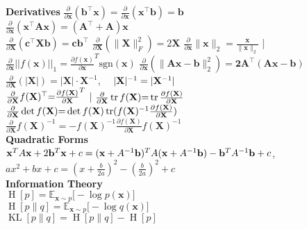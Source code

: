 \textbf{Derivatives} \quad
$\frac{\partial}{\partial \mathbf{x}}(\mathbf{b}^\top \mathbf{x}) = \frac{\partial}{\partial \mathbf{x}}(\mathbf{x}^\top \mathbf{b}) = \mathbf{b}$ \\
$\frac{\partial}{\partial \mathbf{x}}(\mathbf{x}^\top \mathbf{A}\mathbf{x}) = (\mathbf{A}^\top + \mathbf{A})\mathbf{x}$ \\
$\frac{\partial}{\partial \mathbf{X}}(\mathbf{c}^\top \mathbf{X} \mathbf{b}) {=} \mathbf{c}\mathbf{b}^\top$
$\frac{\partial}{\partial \mathbf{X}}(\|\mathbf{X}\|_F^2) {=} 2\mathbf{X}$
$\frac{\partial}{\partial \mathbf{x}}\| \mathbf{x} \|_2 {=} \frac{\mathbf{x}}{\|\mathbf{x}\|_2}$ |
$\frac{\partial}{\partial \mathbf{x}}||f(\mathbf{x})||_1 {=} \frac{\partial f(\mathbf{x})}{\partial \mathbf{x}}^T\text{sgn}(\mathbf{x})$
$\frac{\partial}{\partial \mathbf{x}}(\|\mathbf{Ax - b}\|_2^2) = \mathbf{2A^\top( Ax- b)}$ \\
$\frac{\partial}{\partial \mathbf{X}}(|\mathbf{X}|) = |\mathbf{X}|\cdot \mathbf{X}^{-1}$, $\quad |\mathbf{X}|^{-1} = |\mathbf{X}^{-1}|$\\
$\frac{\partial}{\partial \mathbf{X}} f(\mathbf{X})^\top {=} \frac{\partial f(\mathbf{X})}{\partial \mathbf{X}}^T$ | 
$\frac{\partial}{\partial \mathbf{X}} \operatorname{tr}f(\mathbf{X}) {=} \operatorname{tr}  \frac{\partial f(\mathbf{X})}{\partial \mathbf{X}}$ \\
$\frac{\partial}{\partial \mathbf{X}} \det f(\mathbf{X}) {=} \det f(\mathbf{X}) \operatorname{tr} (f(\mathbf{X})^{-1} \frac{\partial f(\mathbf{X})}{\partial \mathbf{X}})$ \\
$\frac{\partial}{\partial \mathbf{X}} f(\mathbf{X})^{-1} = - f(\mathbf{X})^{-1} \frac{\partial f(\mathbf{X})}{\partial \mathbf{X}} f(\mathbf{X})^{-1}$ 
\vspace{4 px} \\
\textbf{Quadratic Forms} \\
$\mathbf{x}^TA\mathbf{x} + 2\mathbf{b}^T\mathbf{x} + c = (\mathbf{x} + A^{-1}\mathbf{b})^TA \\(\mathbf{x} + A^{-1}\mathbf{b}) - \mathbf{b}^T A^{-1} \mathbf{b} + c$, \\
$ax^2+bx+c = (x + \frac{b}{2a})^2 - (\frac{b}{2a})^2 + c$
\vspace{4 px} \\
\textbf{Information Theory} \\
$\operatorname{H}[p] = \mathbb{E}_{\mathbf{x} \sim p}\bigl[-\log p(\mathbf{x})\bigr]$ \\
$\operatorname{H}[p \| q] = \mathbb{E}_{\mathbf{x} \sim p}\bigl[-\log q(\mathbf{x})\bigr]$ \\
$\operatorname{KL}[p \| q] = \operatorname{H}[p \| q] - \operatorname{H}[p] $ \\
